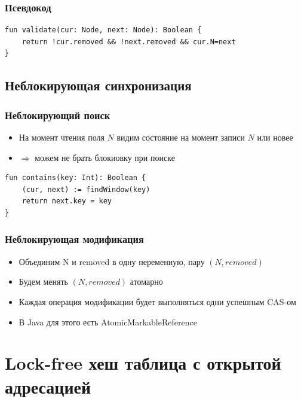 \documentclass[10pt,a4paper,oneside,titlepage]{article}
\theoremstyle{plain}
\theoremstyle{defenition}
\begin{document}
\subsubsection{Псевдокод}

\begin{lstlisting}
fun validate(cur: Node, next: Node): Boolean {
    return !cur.removed && !next.removed && cur.N=next
}
\end{lstlisting}

\subsection{Неблокирующая синхронизация}

\subsubsection{Неблокирующий поиск}

\begin{itemize}
	\item На момент чтения поля $N$ видим состояние на момент записи $N$ или новее
	\item $\Rightarrow$ можем не брать блокиовку при поиске
\end{itemize}

\begin{lstlisting}
fun contains(key: Int): Boolean {
    (cur, next) := findWindow(key)
    return next.key = key
}
\end{lstlisting}

\subsubsection{Неблокирующая модификация}

\begin{itemize}
	\item Объединим N и removed в одну переменную, пару $(N, removed)$
	\item Будем менять $(N, removed)$ атомарно
	\item Каждая операция модификации будет выполняться одни успешным CAS-ом
	\item В Java для этого есть AtomicMarkableReference
\end{itemize}

\section{Lock-free хеш таблица с открытой адресацией}
\end{document}
